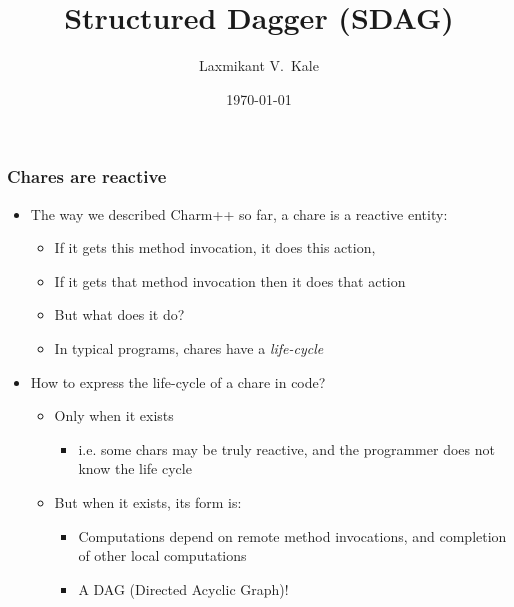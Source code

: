 \documentclass{beamer}
\title{Structured Dagger (SDAG)}
\subtitle{}
\author[Laxmikant V.~Kale]{
Laxmikant V.~Kale
}
\date{\today}
\begin{document}
\begin{frame}[fragile]
  \frametitle{Chares are reactive}
  \begin{itemize}
    \item The way we described Charm++ so far, a chare is a reactive entity:
      \begin{itemize}
      \item If it gets this method invocation, it does this action,
      \item If it gets that method invocation then it does that action
      \item But what does it do?
      \item In typical programs, chares have a \emph{life-cycle}
      \end{itemize}
    \item How to express the life-cycle of a chare in code?
      \begin{itemize}
      \item Only when it exists
        \begin{itemize}
        \item i.e. some chars may be truly reactive, and the programmer does
          not know the life cycle
        \end{itemize}
      \item But when it exists, its form is:
        \begin{itemize}
        \item Computations depend on remote method invocations, and completion
          of other local computations
        \item A DAG (Directed Acyclic Graph)!
        \end{itemize}
      \end{itemize}
  \end{itemize}
\end{frame}
\end{document}
